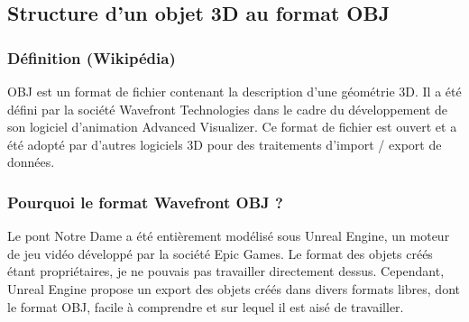 \documentclass[a4paper,french]{report}
\begin{document}
			\subsection{Structure d'un objet 3D au format OBJ}
				\subsubsection{Définition (Wikipédia)}
				OBJ est un format de fichier contenant la description d'une géométrie 3D. Il a été défini par la société Wavefront Technologies dans le cadre du développement de son logiciel d'animation Advanced Visualizer. Ce format de fichier est ouvert et a été adopté par d'autres logiciels 3D pour des traitements d'import / export de données.
				\subsubsection{Pourquoi le format Wavefront OBJ ?}
				Le pont Notre Dame a été entièrement modélisé sous Unreal Engine, un moteur de jeu vidéo développé par la société Epic Games. Le format des objets créés étant propriétaires, je ne pouvais pas travailler directement dessus. Cependant, Unreal Engine propose un export des objets créés dans divers formats libres, dont le format OBJ, facile à comprendre et sur lequel il est aisé de travailler.
\end{document}
